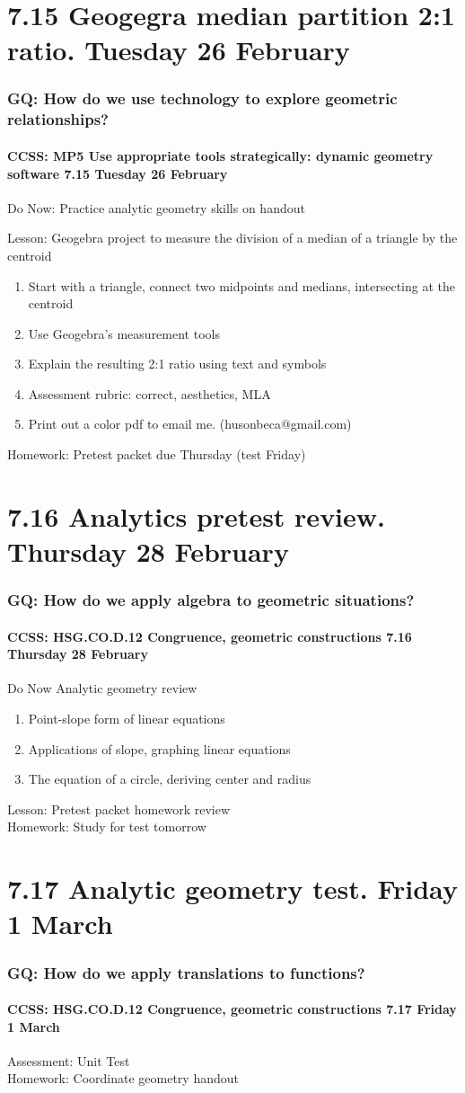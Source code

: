 \documentclass{beamer}
\begin{document}
\section{7.15 Geogegra median partition 2:1 ratio. Tuesday 26 February}
  \frame
  {
    \frametitle{GQ: How do we use technology to explore geometric relationships?}
    \framesubtitle{CCSS: MP5 Use appropriate tools strategically: dynamic geometry software \hfill \alert{7.15 Tuesday 26 February}}

    Do Now: Practice analytic geometry skills on handout
    \begin{block}{Lesson: Geogebra project to measure the division of a median of a triangle by the centroid}
      \begin{enumerate}
        \item Start with a triangle, connect two midpoints and medians, intersecting at the centroid
        \item Use Geogebra's measurement tools
        \item Explain the resulting 2:1 ratio using text and symbols
        \item Assessment rubric: correct, aesthetics, MLA
        \item Print out a color pdf to email me. (husonbeca@gmail.com)
      \end{enumerate}
    \end{block}
    Homework: Pretest packet due Thursday \alert{(test Friday)}
  }

\section{7.16 Analytics pretest review. Thursday 28 February}
  \frame
  {
    \frametitle{GQ: How do we apply algebra to geometric situations?}
    \framesubtitle{CCSS: HSG.CO.D.12 Congruence, geometric constructions \hfill \alert{7.16 Thursday 28 February}}

    \begin{block}{Do Now Analytic geometry review}
      \begin{enumerate}
        \item Point-slope form of linear equations
        \item Applications of slope, graphing linear equations
        \item The equation of a circle, deriving center and radius
      \end{enumerate}
    \end{block}
    Lesson: Pretest packet homework review\\[0.5cm]
    Homework: Study for \alert{test tomorrow}
  }

\section{7.17 Analytic geometry test. Friday 1 March}
  \frame
  {
    \frametitle{GQ: How do we apply translations to functions?}
    \framesubtitle{CCSS: HSG.CO.D.12 Congruence, geometric constructions \hfill \alert{7.17 Friday 1 March}}

    Assessment: Unit Test\\[0.5cm]
    Homework: Coordinate geometry handout
  }
\end{document}

